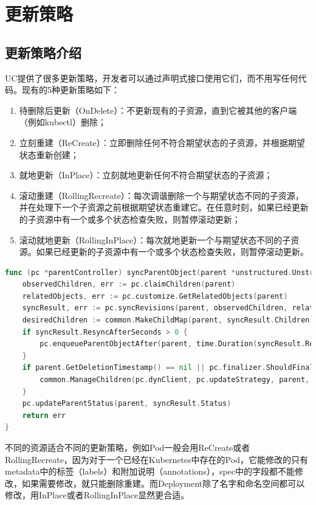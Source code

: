 \documentclass[macfonts,master]{njuthesis}
\begin{document}
\section{更新策略}
\subsection{更新策略介绍}
UC提供了很多更新策略，开发者可以通过声明式接口使用它们，而不用写任何代码。现有的5种更新策略如下：
\begin{enumerate}
	\item 待删除后更新（OnDelete）：不更新现有的子资源，直到它被其他的客户端（例如kubectl）删除；
	\item 立刻重建（ReCreate）：立即删除任何不符合期望状态的子资源，并根据期望状态重新创建；
	\item 就地更新（InPlace）：立刻就地更新任何不符合期望状态的子资源；
	\item 滚动重建（RollingRecreate）：每次调谐删除一个与期望状态不同的子资源，并在处理下一个子资源之前根据期望状态重建它。在任意时刻，如果已经更新的子资源中有一个或多个状态检查失败，则暂停滚动更新；
	\item 滚动就地更新（RollingInPlace）：每次就地更新一个与期望状态不同的子资源。如果已经更新的子资源中有一个或多个状态检查失败，则暂停滚动更新。
\end{enumerate}

\begin{lstlisting}[language=Go,caption=同步父资源,label=listing:syncparent]
func (pc *parentController) syncParentObject(parent *unstructured.Unstructured) error {
	observedChildren, err := pc.claimChildren(parent)
	relatedObjects, err := pc.customize.GetRelatedObjects(parent)
	syncResult, err := pc.syncRevisions(parent, observedChildren, relatedObjects)
	desiredChildren := common.MakeChildMap(parent, syncResult.Children)
	if syncResult.ResyncAfterSeconds > 0 {
		pc.enqueueParentObjectAfter(parent, time.Duration(syncResult.ResyncAfterSeconds*float64(time.Second)))
	}
	if parent.GetDeletionTimestamp() == nil || pc.finalizer.ShouldFinalize(parent) {
		common.ManageChildren(pc.dynClient, pc.updateStrategy, parent, observedChildren, desiredChildren)
	}
	pc.updateParentStatus(parent, syncResult.Status)
	return err
}
\end{lstlisting}

不同的资源适合不同的更新策略，例如Pod一般会用ReCreate或者RollingRecreate，因为对于一个已经在Kubernetes中存在的Pod，它能修改的只有metadata中的标签（labels）和附加说明（annotations），spec中的字段都不能修改，如果需要修改，就只能删除重建。而Deployment除了名字和命名空间都可以修改，用InPlace或者RollingInPlace显然更合适。
\end{document}
